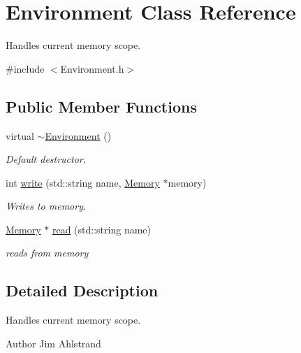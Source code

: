 \hypertarget{classEnvironment}{}\section{Environment Class Reference}
\label{classEnvironment}


Handles current memory scope.  




{\ttfamily \#include $<$Environment.\+h$>$}

\subsection*{Public Member Functions}
\begin{DoxyCompactItemize}
\item 
\hypertarget{classEnvironment_a8e294735187880dd3d59be10c425b29d}{}virtual \hyperlink{classEnvironment_a8e294735187880dd3d59be10c425b29d}{$\sim$\+Environment} ()\label{classEnvironment_a8e294735187880dd3d59be10c425b29d}

\begin{DoxyCompactList}\small\item\em Default destructor. \end{DoxyCompactList}\item 
int \hyperlink{classEnvironment_a225cc24b6810880fdaf914327caf1662}{write} (std\+::string name, \hyperlink{classMemory}{Memory} $\ast$memory)
\begin{DoxyCompactList}\small\item\em Writes to memory. \end{DoxyCompactList}\item 
\hyperlink{classMemory}{Memory} $\ast$ \hyperlink{classEnvironment_a44bfdd6aa66ff6503c57e5e89ee2dd9c}{read} (std\+::string name)
\begin{DoxyCompactList}\small\item\em reads from memory \end{DoxyCompactList}\end{DoxyCompactItemize}


\subsection{Detailed Description}
Handles current memory scope. 

\begin{DoxyAuthor}{Author}
Jim Ahlstrand 
\end{DoxyAuthor}


